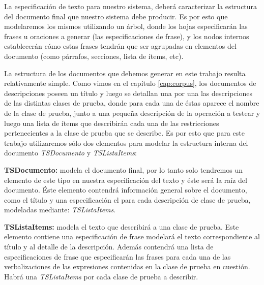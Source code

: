 

La especificación de texto para nuestro sistema, deberá caracterizar la estructura del documento final que nuestro sistema debe producir. Es por esto que modelaremos los mismos utilizando un árbol, donde los hojas especificarán las frases u oraciones a generar (las especificaciones de frase), y los nodos internos establecerán cómo estas frases tendrán que ser agrupadas en elementos del documento (como párrafos, secciones, lista de ítems, etc). 

La estructura de los documentos que debemos generar en este trabajo resulta relativamente simple. Como vimos en el capítulo \ref{cap:corpus}, los documentos de descripciones poseen un título y luego se detallan una por una las descripciones de las distintas clases de prueba, donde para cada una de éstas aparece el nombre de la clase de prueba, junto a una pequeña descripción de la operación a testear y luego una lista de ítems que describirán cada una de las restricciones pertenecientes a la clase de prueba que se describe. Es por esto que para este trabajo utilizaremos sólo dos elementos para modelar la estructura interna del documento \emph{TSDocumento} y \emph{TSListaItems}:

\medskip
\noindent
\textbf{TSDocumento:} modela el documento final, por lo tanto solo tendremos un elemento de este tipo en nuestra especificación del texto y éste será la raíz del documento. Éste elemento contendrá información general sobre el documento, como el título y una especificación el para cada descripción de clase de prueba, modeladas mediante: \emph{TSListaItems}.

\medskip
\noindent
\textbf{TSListaItems:} modela el texto que describirá a una clase de prueba. Este elemento contiene una especificación de frase modelará el texto correspondiente al título y al detalle de la descripción. Además contendrá una lista de especificaciones de frase que especificarán las frases para cada una de las verbalizaciones de las expresiones contenidas en la clase de prueba en cuestión. Habrá una \emph{TSListaItems} por cada clase de prueba a describir.

